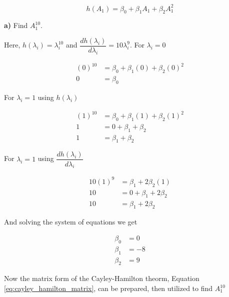 \begin{equation}\label{eq:cayley_hamilton_matrix}
  h(A_1) = \beta_0 + \beta_1 A_1 + \beta_2 A_1^2
\end{equation}

\noindent \textbf{a)} Find $A_1^{10}$.

Here, $h(\lambda_i) = \lambda_i^{10}$ and 
$\dfrac{d h(\lambda_i)}{d\lambda_i} = 10 \lambda_i^9$. For $\lambda_i = 0$ 


\begin{align}
  (0)^{10} &= \beta_0 + \beta_1 (0) + \beta_2 (0)^2 \nonumber \\
         0 &= \beta_0 
\end{align}

For $\lambda_i = 1$ using $h(\lambda_i)$


\begin{align}
  (1)^{10} &= \beta_0 + \beta_1 (1) + \beta_2 (1)^2 \nonumber \\
         1 &= 0 + \beta_1 + \beta_2 \nonumber \\
         1 &= \beta_1 + \beta_2
\end{align}

For $\lambda_i = 1$ using $\dfrac{d h(\lambda_i)}{d \lambda_i}$


\begin{align}
  10(1)^{9} &=  \beta_1 + 2 \beta_2 (1) \nonumber \\
         10 &= 0 + \beta_1 + 2 \beta_2 \nonumber \\
         10 &= \beta_1 + 2 \beta_2
\end{align}

And solving the system of equations we get

\begin{align}
  \beta_0 &= 0  \nonumber \\
  \beta_1 &= -8 \\
  \beta_2 &= 9  \nonumber
\end{align}

Now the matrix form of the Cayley-Hamilton theorm, 
Equation \ref{eq:cayley_hamilton_matrix}, can be prepared, then utilized to find
$A_1^{10}$

